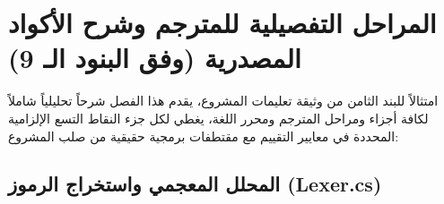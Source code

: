 \documentclass[12pt,a4paper]{report}
\begin{document}
\newpage

\chapter{المراحل التفصيلية للمترجم وشرح الأكواد المصدرية (وفق البنود الـ 9)}

امتثالاً للبند الثامن من وثيقة تعليمات المشروع، يقدم هذا الفصل شرحاً تحليلياً شاملاً لكافة أجزاء ومراحل المترجم ومحرر اللغة، يغطي لكل جزء النقاط التسع الإلزامية المحددة في معايير التقييم مع مقتطفات برمجية حقيقية من صلب المشروع:

\section{المحلل المعجمي واستخراج الرموز (Lexer.cs)}
\end{document}
